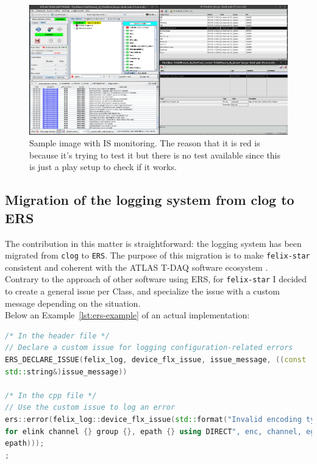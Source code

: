 \begin{figure}[H]
\centering
\includegraphics[width=\textwidth]{images/results/IS-monitoring.png}
\caption[IS monitoring screenshot]{Sample image with IS monitoring. The reason that it is red is because it's trying to test it but there is no test available since this is just a play setup to check if it works.}
\label{fig:felix-tohost-is}
\end{figure}


\subsection{Migration of the logging system from clog to ERS}

The contribution in this matter is straightforward: the logging system has been migrated from \texttt{clog} to \texttt{ERS}. The purpose of this migration is to make \texttt{felix-star} consistent and coherent with the \acs{ATLAS} \acs{T-DAQ} software ecosystem \cite{felix-star-clog-to-ers}.\\
Contrary to the approach of other software using ERS, for \texttt{felix-star} I decided to create a general issue per Class, and specialize the issue with a custom message depending on the situation.\\
Below an Example~\ref{lst:ers-example} of an actual implementation:

\begin{lstlisting}[language=C++, caption={Example of ERS custom issue declaration and usage.}, label={lst:ers-example}]
/* In the header file */
// Declare a custom issue for logging configuration-related errors
ERS_DECLARE_ISSUE(felix_log, device_flx_issue, issue_message, ((const
std::string&)issue_message))

/* In the cpp file */
// Use the custom issue to log an error
ers::error(felix_log::device_flx_issue(std::format("Invalid encoding type {}
for elink channel {} group {}, epath {} using DIRECT", enc, channel, egroup,
epath)));
;
\end{lstlisting}
